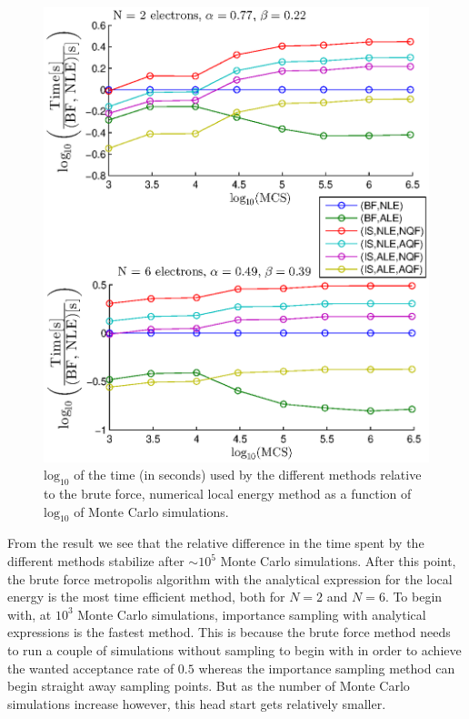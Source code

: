 \begin{figure}[h!]
	\centering 
	\includegraphics[width=\textwidth]{results/times.eps}
	\caption{$\textrm{log}_{10}$ of the time (in seconds) used by the different methods relative to the brute force, numerical local energy method as a function of $\textrm{log}_{10}$ of Monte Carlo simulations.}
	\label{fig:res_times}
\end{figure}

From the result we see that the relative difference in the time spent by the different methods stabilize after $\sim 10^5$ Monte Carlo simulations. 
After this point, the brute force metropolis algorithm with the analytical expression for the local energy is the most time efficient method, both for $N=2$ and $N=6$. 
To begin with, at $10^3$ Monte Carlo simulations, importance sampling with analytical expressions is the fastest method.
This is because the brute force method needs to run a couple of simulations without sampling to begin with in order to achieve the wanted acceptance rate of $0.5$ whereas the importance sampling method can begin straight away sampling points. 
But as the number of Monte Carlo simulations increase however, this head start gets relatively smaller. 

